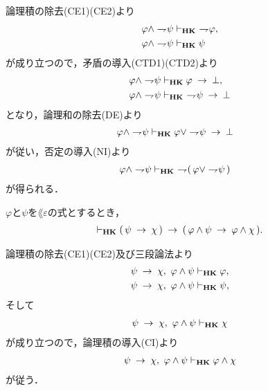 	\begin{sketch}
		論理積の除去(CE1)(CE2)より
		\begin{align}
			\varphi \wedge \rightharpoondown\hspace{-0.25em} \psi &\vdash_{{\scriptsize \mbox{{\bf HK}}}}\ \rightharpoondown\hspace{-0.25em} \varphi, \\
			\varphi \wedge \rightharpoondown\hspace{-0.25em} \psi &\vdash_{{\scriptsize \mbox{{\bf HK}}}} \psi
		\end{align}
		が成り立つので，矛盾の導入(CTD1)(CTD2)より
		\begin{align}
			\varphi \wedge \negation \psi &\provable{\mbox{{\bf HK}}}
			\varphi \rarrow \bot, \\
			\varphi \wedge \negation \psi &\provable{\mbox{{\bf HK}}}\ 
			\negation \psi \rarrow \bot
		\end{align}
		となり，論理和の除去(DE)より
		\begin{align}
			\varphi \wedge \rightharpoondown\hspace{-0.25em} \psi &\vdash_{{\scriptsize \mbox{{\bf HK}}}}
			\varphi \vee \rightharpoondown\hspace{-0.25em} \psi \hspace{0.25em}\rightarrow\hspace{0.25em} \bot
		\end{align}
		が従い，否定の導入(NI)より
		\begin{align}
			\varphi \wedge \negation \psi &\provable{\mbox{{\bf HK}}}\ 
			\negation (\, \varphi \vee \negation \psi\, )
		\end{align}
		が得られる．
		\QED
	\end{sketch}
	
	\begin{screen}
		\begin{thm}[含意の論理積への遺伝性]
		\label{classic:heredity_of_implication_to_conjunction}
			$\varphi$と$\psi$を$\lang{\varepsilon}$の式とするとき，
			\begin{align}
				\vdash_{{\scriptsize \mbox{{\bf HK}}}} (\, \psi \hspace{0.25em}\rightarrow\hspace{0.25em} \chi\, )
				\hspace{0.25em}\rightarrow\hspace{0.25em} (\, \varphi \wedge \psi \hspace{0.25em}\rightarrow\hspace{0.25em} \varphi \wedge \chi\, ).
			\end{align}
		\end{thm}
	\end{screen}
	
	\begin{sketch}
		論理積の除去(CE1)(CE2)及び三段論法より
		\begin{align}
			\psi \hspace{0.25em}\rightarrow\hspace{0.25em} \chi,\ \varphi \wedge \psi &\vdash_{{\scriptsize \mbox{{\bf HK}}}} \varphi, \\
			\psi \hspace{0.25em}\rightarrow\hspace{0.25em} \chi,\ \varphi \wedge \psi &\vdash_{{\scriptsize \mbox{{\bf HK}}}} \psi,
		\end{align}
		そして
		\begin{align}
			\psi \hspace{0.25em}\rightarrow\hspace{0.25em} \chi,\ \varphi \wedge \psi \vdash_{{\scriptsize \mbox{{\bf HK}}}} \chi
		\end{align}
		が成り立つので，論理積の導入(CI)より
		\begin{align}
			\psi \hspace{0.25em}\rightarrow\hspace{0.25em} \chi,\ \varphi \wedge \psi \vdash_{{\scriptsize \mbox{{\bf HK}}}} \varphi \wedge \chi
		\end{align}
		が従う．
		\QED
	\end{sketch}
	
